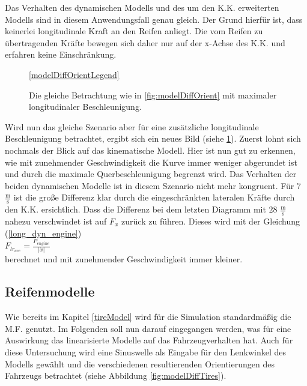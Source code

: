 \documentclass{like}
\begin{document}
Das Verhalten des dynamischen Modells und des um den \ac{K.K.} erweiterten Modells sind in diesem Anwendungsfall genau gleich. Der Grund hierfür ist, dass keinerlei longitudinale Kraft an den Reifen anliegt. Die vom Reifen zu übertragenden Kräfte bewegen sich daher nur auf der x-Achse des \ac{K.K.} und erfahren keine Einschränkung. 


\begin{figure}
	\centering
	\subfigure{
		 
	}%
	\subfigure{
		 
	}	
	\ref{modelDiffOrientLegend}
	\caption{Die gleiche Betrachtung wie in \ref{fig:modelDiffOrient} mit maximaler longitudinaler Be\-schleu\-ni\-gung.}\label{fig:modelDiffOrientMaxAcc}
\end{figure}

Wird nun das gleiche Szenario aber für eine zusätzliche longitudinale Beschleunigung betrachtet, ergibt sich ein neues Bild (siehe \ref{fig:modelDiffOrientMaxAcc}).
Zuerst lohnt sich nochmals der Blick auf das kinematische Modell. Hier ist nun gut zu erkennen, wie mit zunehmender Ge\-schwin\-dig\-keit die Kurve immer weniger abgerundet ist und durch die maximale Querbeschleunigung begrenzt wird. Das Verhalten der beiden dynamischen Modelle ist in diesem Szenario nicht mehr kongruent. Für $7$ $\frac{\text{m}}{\text{s}}$ ist die große Differenz klar durch die eingeschränkten lateralen Kräfte durch den \ac{K.K.} ersichtlich. Dass die Differenz bei dem letzten Diagramm mit $28$ $\frac{\text{m}}{\text{s}}$ nahezu verschwindet ist auf $F_x$ zurück zu führen. Dieses wird mit der Gleichung (\ref{long_dyn_engine}) \\ 
$F_{lr_{acc}} = \frac{P_{engine}}{|\dot{x}|}$\\
berechnet und mit zunehmender Geschwindigkeit immer kleiner. 


\subsection{Reifenmodelle}
Wie bereits im Kapitel \ref{tireModel} wird für die Simulation standardmäßig die \ac{M.F.} genutzt. Im Folgenden soll nun darauf eingegangen werden, was für eine Auswirkung das linearisierte  Modelle auf das Fahrzeugverhalten hat. Auch für diese Untersuchung wird eine Sinuswelle als Eingabe für den Lenkwinkel des Modells gewählt und die verschiedenen resultierenden Orientierungen des Fahrzeugs betrachtet (siehe Abbildung \ref{fig:modelDiffTires}).
\end{document}
